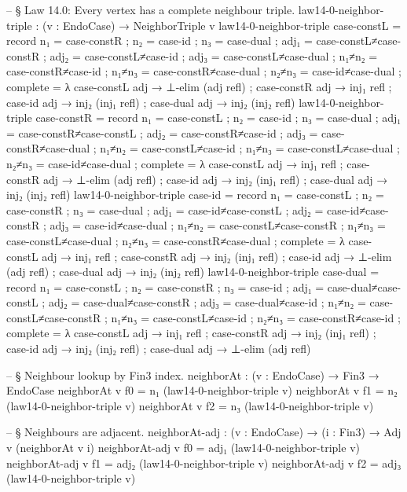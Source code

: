 \documentclass[11pt,a4paper]{book}
\begin{document}
\begin{code}
-- § Law 14.0: Every vertex has a complete neighbour triple.
law14-0-neighbor-triple : (v : EndoCase) → NeighborTriple v
law14-0-neighbor-triple case-constL = record
  { n₁ = case-constR
  ; n₂ = case-id
  ; n₃ = case-dual
  ; adj₁ = case-constL≠case-constR
  ; adj₂ = case-constL≠case-id
  ; adj₃ = case-constL≠case-dual
  ; n₁≠n₂ = case-constR≠case-id
  ; n₁≠n₃ = case-constR≠case-dual
  ; n₂≠n₃ = case-id≠case-dual
  ; complete = λ
      { case-constL adj → ⊥-elim (adj refl)
      ; case-constR adj → inj₁ refl
      ; case-id     adj → inj₂ (inj₁ refl)
      ; case-dual   adj → inj₂ (inj₂ refl)
      }
  }
law14-0-neighbor-triple case-constR = record
  { n₁ = case-constL
  ; n₂ = case-id
  ; n₃ = case-dual
  ; adj₁ = case-constR≠case-constL
  ; adj₂ = case-constR≠case-id
  ; adj₃ = case-constR≠case-dual
  ; n₁≠n₂ = case-constL≠case-id
  ; n₁≠n₃ = case-constL≠case-dual
  ; n₂≠n₃ = case-id≠case-dual
  ; complete = λ
      { case-constL adj → inj₁ refl
      ; case-constR adj → ⊥-elim (adj refl)
      ; case-id     adj → inj₂ (inj₁ refl)
      ; case-dual   adj → inj₂ (inj₂ refl)
      }
  }
law14-0-neighbor-triple case-id = record
  { n₁ = case-constL
  ; n₂ = case-constR
  ; n₃ = case-dual
  ; adj₁ = case-id≠case-constL
  ; adj₂ = case-id≠case-constR
  ; adj₃ = case-id≠case-dual
  ; n₁≠n₂ = case-constL≠case-constR
  ; n₁≠n₃ = case-constL≠case-dual
  ; n₂≠n₃ = case-constR≠case-dual
  ; complete = λ
      { case-constL adj → inj₁ refl
      ; case-constR adj → inj₂ (inj₁ refl)
      ; case-id     adj → ⊥-elim (adj refl)
      ; case-dual   adj → inj₂ (inj₂ refl)
      }
  }
law14-0-neighbor-triple case-dual = record
  { n₁ = case-constL
  ; n₂ = case-constR
  ; n₃ = case-id
  ; adj₁ = case-dual≠case-constL
  ; adj₂ = case-dual≠case-constR
  ; adj₃ = case-dual≠case-id
  ; n₁≠n₂ = case-constL≠case-constR
  ; n₁≠n₃ = case-constL≠case-id
  ; n₂≠n₃ = case-constR≠case-id
  ; complete = λ
      { case-constL adj → inj₁ refl
      ; case-constR adj → inj₂ (inj₁ refl)
      ; case-id     adj → inj₂ (inj₂ refl)
      ; case-dual   adj → ⊥-elim (adj refl)
      }
  }

-- § Neighbour lookup by Fin3 index.
neighborAt : (v : EndoCase) → Fin3 → EndoCase
neighborAt v f0 = n₁ (law14-0-neighbor-triple v)
neighborAt v f1 = n₂ (law14-0-neighbor-triple v)
neighborAt v f2 = n₃ (law14-0-neighbor-triple v)

-- § Neighbours are adjacent.
neighborAt-adj : (v : EndoCase) → (i : Fin3) → Adj v (neighborAt v i)
neighborAt-adj v f0 = adj₁ (law14-0-neighbor-triple v)
neighborAt-adj v f1 = adj₂ (law14-0-neighbor-triple v)
neighborAt-adj v f2 = adj₃ (law14-0-neighbor-triple v)


\end{code}
\end{document}
